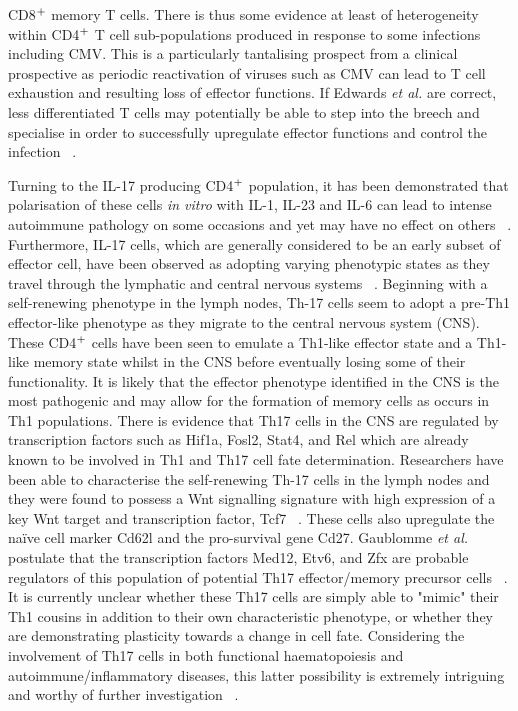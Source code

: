 CD8$\textsuperscript{+}$ memory T cells. There is thus some evidence at least of heterogeneity within CD4$\textsuperscript{+}$ T cell sub-populations produced in response to some infections including CMV. This is a particularly tantalising prospect from a clinical prospective as periodic reactivation of viruses such as CMV can lead to T cell exhaustion and resulting loss of effector functions. If Edwards \textit{et al.} are correct, less differentiated T cells may potentially be able to step into the breech and specialise in order to successfully upregulate effector functions and control the infection ~\autocite{Edw2014}. 

Turning to the IL-17 producing CD4$\textsuperscript{+}$ population, it has been demonstrated that polarisation of these cells \textit{in vitro} with IL-1, IL-23 and IL-6 can lead to intense autoimmune pathology on some occasions and yet may have no effect on others ~\autocite{Gau2015}. Furthermore, IL-17 cells, which are generally considered to be an early subset of effector cell, have been observed as adopting varying phenotypic states as they travel through the lymphatic and central nervous systems ~\autocite{Tia2013,Gau2015}. Beginning with a self-renewing phenotype in the lymph nodes, Th-17 cells seem to adopt a pre-Th1 effector-like phenotype as they migrate to the central nervous system (CNS). These CD4$\textsuperscript{+}$ cells have been seen to emulate a Th1-like effector state and a Th1-like memory state whilst in the CNS before eventually losing some of their functionality. It is likely that the effector phenotype identified in the CNS is the most pathogenic and may allow for the formation of memory cells as occurs in Th1 populations. There is evidence that Th17 cells in the CNS are regulated by transcription factors such as Hif1a, Fosl2, Stat4, and Rel which are already known to be involved in Th1 and Th17 cell fate determination. Researchers have been able to characterise the self-renewing Th-17 cells in the lymph nodes and they were found to possess a Wnt signalling signature with high expression of a key Wnt target and transcription factor, Tcf7 ~\autocite{Gau2015}. These cells also upregulate the na\"ive cell marker Cd62l and the pro-survival gene Cd27. Gaublomme \textit{et al.} postulate that the transcription factors Med12, Etv6, and Zfx are probable regulators of this population of potential Th17 effector/memory precursor cells ~\autocite{Gau2015}. It is currently unclear whether these Th17 cells are simply able to "mimic"  their Th1 cousins in addition to their own characteristic phenotype, or whether they are demonstrating plasticity towards a change in cell fate. Considering the involvement of Th17 cells in both functional haematopoiesis and autoimmune/inflammatory diseases, this latter possibility is extremely intriguing and worthy of further investigation ~\autocite{Tia2013}.  

